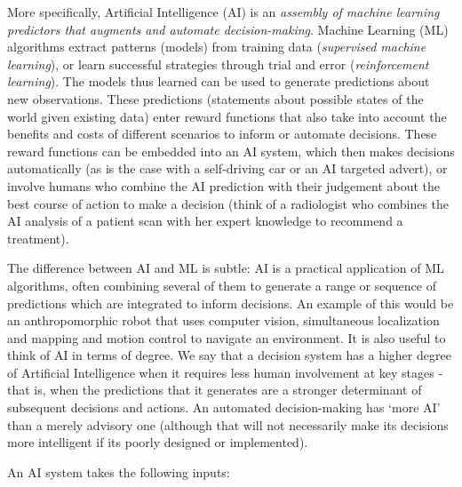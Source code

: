 \documentclass[11pt]{article}
\begin{document}
More specifically, Artificial Intelligence (AI) is an \textit{assembly of machine learning predictors that augments and automate decision-making}. Machine Learning (ML) algorithms extract patterns (models) from training data (\textit{supervised machine learning}), or learn successful strategies through trial and error (\textit{reinforcement learning}). The models thus learned can be used to generate predictions about new observations. These predictions (statements about possible states of the world given existing data) enter reward functions that also take into account the benefits and costs of different scenarios to inform or automate decisions. These reward functions can be embedded into an AI system, which then makes decisions automatically (as is the case with a self-driving car or an AI targeted advert), or involve humans who combine the AI prediction with their judgement about the best course of action to make a decision (think of a radiologist who combines the AI analysis of a patient scan with her expert knowledge to recommend a treatment).

The difference between AI and ML is subtle: AI is a practical application of ML algorithms, often combining several of them to generate a range or sequence of predictions which are integrated to inform decisions. An example of this would be an anthropomorphic robot that uses computer vision, simultaneous localization and mapping and motion control to navigate an environment. It is also useful to think of AI in terms of degree. We say that a decision system has a higher degree of Artificial Intelligence when it requires less human involvement at key stages - that is, when the predictions that it generates are a stronger determinant of subsequent decisions and actions. An automated decision-making has `more AI' than a merely advisory one (although that will not necessarily make its decisions more intelligent if its poorly designed or implemented).

An AI system takes the following inputs: 
\end{document}
